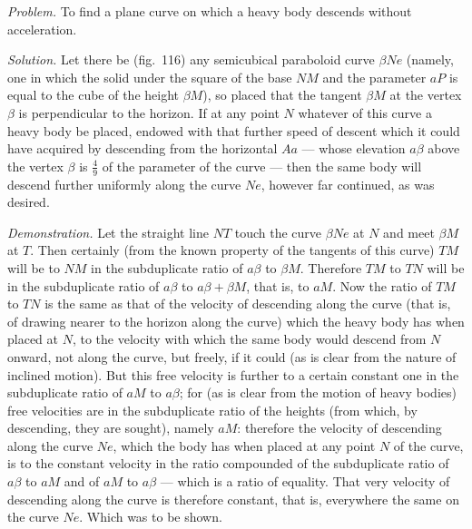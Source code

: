 \documentclass{article}
\begin{document}
\emph{Problem.} To find a plane curve on which a heavy body descends without acceleration.

\emph{Solution.} Let there be (fig.~116) any semicubical paraboloid curve $\beta Ne$ (namely, one
in which the solid under the square of the base $NM$ and the parameter $aP$ is equal to the cube
of the height $\beta M$), so placed that the tangent $\beta M$ at the vertex $\beta$ is
perpendicular to the horizon. If at any point $N$ whatever of this curve a heavy body be placed,
endowed with that further speed of descent which it could have acquired by descending from the
horizontal $Aa$ — whose elevation $a\beta$ above the vertex $\beta$ is $\frac{4}{9}$ of the
parameter of the curve — then the same body will descend further uniformly along the curve $Ne$,
however far continued, as was desired.

\emph{Demonstration.} Let the straight line $NT$ touch the curve $\beta Ne$ at $N$ and meet
$\beta M$ at $T$. Then certainly (from the known property of the tangents of this curve) $TM$ will
be to $NM$ in the subduplicate ratio of $a\beta$ to $\beta M$. Therefore $TM$ to $TN$ will be in
the subduplicate ratio of $a\beta$ to $a\beta + \beta M$, that is, to $aM$. Now the ratio of $TM$
to $TN$ is the same as that of the velocity of descending along the curve (that is, of drawing
nearer to the horizon along the curve) which the heavy body has when placed at $N$, to the
velocity with which the same body would descend from $N$ onward, not along the curve, but freely,
if it could (as is clear from the nature of inclined motion). But this free velocity is further
to a certain constant one in the subduplicate ratio of $aM$ to $a\beta$; for (as is clear from the
motion of heavy bodies) free velocities are in the subduplicate ratio of the heights
(from which, by descending, they are sought), namely $aM$: therefore the velocity of descending
along the curve $Ne$, which the body has when placed at any point $N$ of the curve, is to the
constant velocity in the ratio compounded of the subduplicate ratio of $a\beta$ to $aM$ and of
$aM$ to $a\beta$ — which is a ratio of equality. That very velocity of descending along the curve
is therefore constant, that is, everywhere the same on the curve $Ne$. Which was to be shown.
\end{document}
